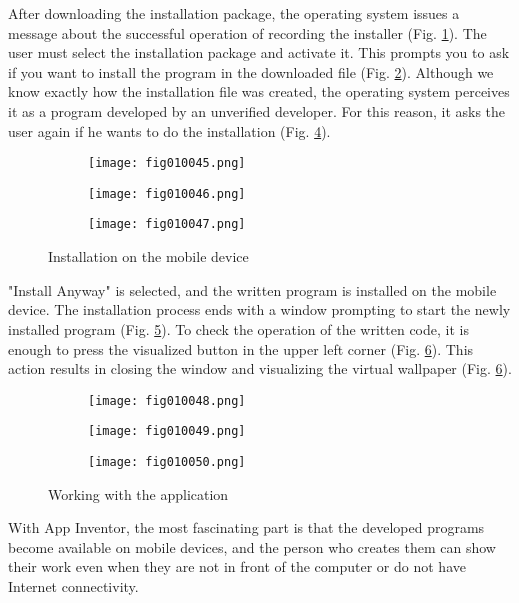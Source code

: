 After downloading the installation package, the operating system issues a message about the successful operation of recording the installer (Fig. \ref{fig010045}). The user must select the installation package and activate it. This prompts you to ask if you want to install the program in the downloaded file (Fig. \ref{fig010046}). Although we know exactly how the installation file was created, the operating system perceives it as a program developed by an unverified developer. For this reason, it asks the user again if he wants to do the installation (Fig. \ref{fig010047}).

\begin{figure}[H]
   \begin{subfigure}{0.31\textwidth}
   \texttt{[image: fig010045.png]}
   \label{fig010045}
   \end{subfigure}
   \begin{subfigure}{0.31\textwidth}
   \texttt{[image: fig010046.png]}
   \label{fig010046}
   \end{subfigure}
   \begin{subfigure}{0.31\textwidth}
   \texttt{[image: fig010047.png]}
   \label{fig010047}
   \end{subfigure}
   \caption{Installation on the mobile device}
\end{figure}

"Install Anyway" is selected, and the written program is installed on the mobile device. The installation process ends with a window prompting to start the newly installed program (Fig. \ref{fig010048}). To check the operation of the written code, it is enough to press the visualized button in the upper left corner (Fig. \ref{fig010049}). This action results in closing the window and visualizing the virtual wallpaper (Fig. \ref{fig010049}).

\begin{figure}[H]
   \begin{subfigure}{0.31\textwidth}
   \texttt{[image: fig010048.png]}
   \label{fig010048}
   \end{subfigure}
   \begin{subfigure}{0.31\textwidth}
   \texttt{[image: fig010049.png]}
   \label{fig010049}
   \end{subfigure}
   \begin{subfigure}{0.31\textwidth}
   \texttt{[image: fig010050.png]}
   \label{fig010050}
   \end{subfigure}
   \caption{Working with the application}
\end{figure}

With App Inventor, the most fascinating part is that the developed programs become available on mobile devices, and the person who creates them can show their work even when they are not in front of the computer or do not have Internet connectivity.
